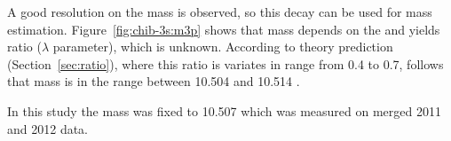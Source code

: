 A good resolution on the \chiboneThreeP mass is observed, so this decay can be
used for \chiboneThreeP mass estimation. Figure~\ref{fig:chib-3s:m3p} shows
that \chiboneThreeP mass depends on the \chiboneThreeP and \chibtwoThreeP 
yields ratio ($\lambda$ parameter), which is unknown. 
According to theory prediction (Section~\ref{sec:ratio}), where this ratio is
variates in range from 0.4 to 0.7, follows that \chiboneThreeP mass is in 
the range between 10.504 and 10.514 \gevcc.




In this study the mass was fixed to 10.507 \gevcc which was measured on merged 2011 and 2012 data.





